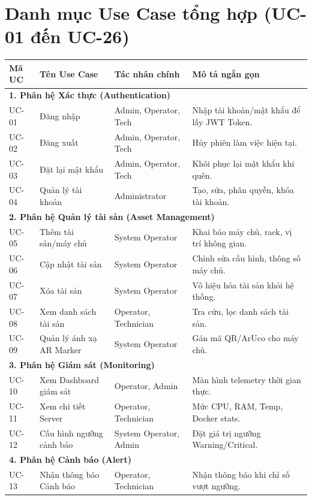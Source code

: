 \section{Danh mục Use Case tổng hợp (UC-01 đến UC-26)}
\begin{longtable}{|p{1.5cm}|p{4.5cm}|p{3.5cm}|p{5cm}|}
\hline
\textbf{Mã UC} & \textbf{Tên Use Case} & \textbf{Tác nhân chính} & \textbf{Mô tả ngắn gọn} \\ \hline
\endhead
\multicolumn{4}{|l|}{\textbf{1. Phân hệ Xác thực (Authentication)}} \\ \hline
UC-01 & Đăng nhập & Admin, Operator, Tech & Nhập tài khoản/mật khẩu để lấy JWT Token. \\ \hline
UC-02 & Đăng xuất & Admin, Operator, Tech & Hủy phiên làm việc hiện tại. \\ \hline
UC-03 & Đặt lại mật khẩu & Admin, Operator, Tech & Khôi phục lại mật khẩu khi quên. \\ \hline
UC-04 & Quản lý tài khoản & Administrator & Tạo, sửa, phân quyền, khóa tài khoản. \\ \hline
\multicolumn{4}{|l|}{\textbf{2. Phân hệ Quản lý tài sản (Asset Management)}} \\ \hline
UC-05 & Thêm tài sản/máy chủ & System Operator & Khai báo máy chủ, rack, vị trí không gian. \\ \hline
UC-06 & Cập nhật tài sản & System Operator & Chỉnh sửa cấu hình, thông số máy chủ. \\ \hline
UC-07 & Xóa tài sản & System Operator & Vô hiệu hóa tài sản khỏi hệ thống. \\ \hline
UC-08 & Xem danh sách tài sản & Operator, Technician & Tra cứu, lọc danh sách tài sản. \\ \hline
UC-09 & Quản lý ánh xạ AR Marker & System Operator & Gán mã QR/ArUco cho máy chủ. \\ \hline
\multicolumn{4}{|l|}{\textbf{3. Phân hệ Giám sát (Monitoring)}} \\ \hline
UC-10 & Xem Dashboard giám sát & Operator, Admin & Màn hình telemetry thời gian thực. \\ \hline
UC-11 & Xem chi tiết Server & Operator, Technician & Mức CPU, RAM, Temp, Docker stats. \\ \hline
UC-12 & Cấu hình ngưỡng cảnh báo & System Operator, Admin & Đặt giá trị ngưỡng Warning/Critical. \\ \hline
\multicolumn{4}{|l|}{\textbf{4. Phân hệ Cảnh báo (Alert)}} \\ \hline
UC-13 & Nhận thông báo Cảnh báo & Operator, Technician & Nhận thông báo khi chỉ số vượt ngưỡng. \\ \hline

\end{longtable}

